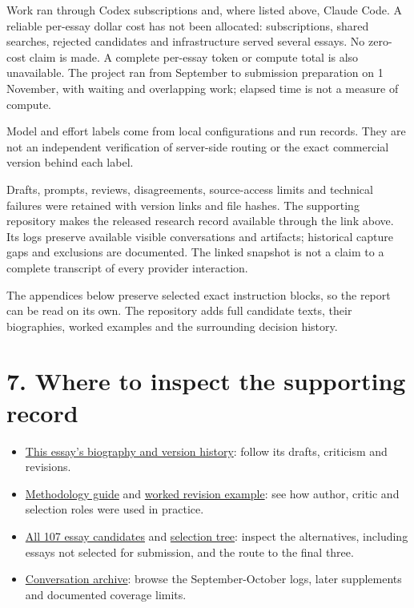 Work ran through Codex subscriptions and, where listed above, Claude Code. A reliable per-essay dollar cost has not been allocated: subscriptions, shared searches, rejected candidates and infrastructure served several essays. No zero-cost claim is made. A complete per-essay token or compute total is also unavailable. The project ran from September to submission preparation on 1 November, with waiting and overlapping work; elapsed time is not a measure of compute.

Model and effort labels come from local configurations and run records. They are not an independent verification of server-side routing or the exact commercial version behind each label.

Drafts, prompts, reviews, disagreements, source-access limits and technical failures were retained with version links and file hashes. The supporting repository makes the released research record available through the link above. Its logs preserve available visible conversations and artifacts; historical capture gaps and exclusions are documented. The linked snapshot is not a claim to a complete transcript of every provider interaction.

The appendices below preserve selected exact instruction blocks, so the report can be read on its own. The repository adds full candidate texts, their biographies, worked examples and the surrounding decision history.

\section*{7. Where to inspect the supporting record}

\begin{itemize}
\item \href{https://anonymous.4open.science/r/philosophy-lab-public-D1C2/essays/E050/README.md}{This essay's biography and version history}: follow its drafts, criticism and revisions.
\item \href{https://anonymous.4open.science/r/philosophy-lab-public-D1C2/docs/method.md}{Methodology guide} and \href{https://anonymous.4open.science/r/philosophy-lab-public-D1C2/docs/worked-example.md}{worked revision example}: see how author, critic and selection roles were used in practice.
\item \href{https://anonymous.4open.science/r/philosophy-lab-public-D1C2/essays/topics.md}{All 107 essay candidates} and \href{https://anonymous.4open.science/r/philosophy-lab-public-D1C2/docs/selection-tree.md}{selection tree}: inspect the alternatives, including essays not selected for submission, and the route to the final three.
\item \href{https://anonymous.4open.science/r/philosophy-lab-public-D1C2/logs/README.md}{Conversation archive}: browse the September-October logs, later supplements and documented coverage limits.
\end{itemize}

